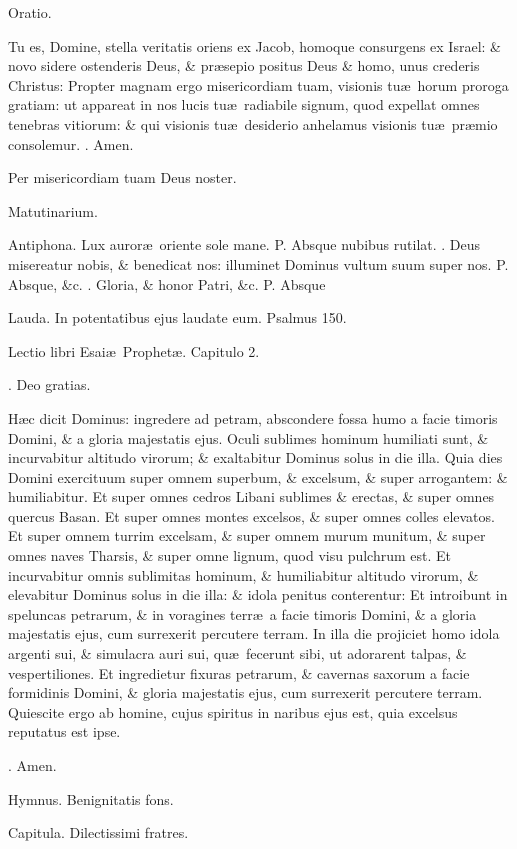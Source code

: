 \documentclass[letter,11pt]{book}
\makeatletter
\DeclareRobustCommand{\Vbar}{\vers@resp{-0.1em}{V}}
\DeclareRobustCommand{\Rbar}{\vers@resp{0pt}{R}}
\newcommand{\vers@resp@sym}{\raisebox{0.2ex}{\rotatebox[origin=c]{-20}{$\m@th\rceil$}}}
\newcommand{\vers@resp}[2]{%
  {\ooalign{\hidewidth\kern#1\vers@resp@sym\hidewidth\cr#2\cr}}%
}%
\def\P{\color{Red} P. \color{black}}
\def\V{\color{Red} \Vbar . \color{black}}
\def\R{\color{Red} \Rbar . \color{black}}
\makeatother
\begin{document}
\begin{multicols*}{2}
Oratio.

Tu es, Domine, stella veritatis oriens ex Jacob, homoque consurgens ex Israel: \& novo sidere ostenderis Deus, \& pr\ae sepio positus Deus \& homo, unus crederis Christus: Propter magnam ergo misericordiam tuam, visionis tu\ae \ horum proroga gratiam: ut appareat in nos lucis tu\ae \ radiabile signum, quod expellat omnes tenebras vitiorum: \& qui visionis tu\ae \ desiderio anhelamus visionis tu\ae \ pr\ae mio consolemur.
\R Amen.

Per misericordiam tuam Deus noster.

Matutinarium.

Antiphona. Lux auror\ae \ oriente sole mane. \P Absque nubibus rutilat. \V Deus misereatur nobis, \& benedicat nos: illuminet Dominus vultum suum super nos. \P Absque, \&c. \V Gloria, \& honor Patri, \&c. \P Absque

Lauda. In potentatibus ejus laudate eum. Psalmus 150.

Lectio libri Esai\ae \ Prophet\ae . Capitulo 2.

\R Deo gratias.

H\ae c dicit Dominus: ingredere ad petram, abscondere fossa humo a facie timoris Domini, \& a gloria majestatis ejus. Oculi sublimes hominum humiliati sunt, \& incurvabitur altitudo virorum; \& exaltabitur Dominus solus in die illa. Quia dies Domini exercituum super omnem superbum, \& excelsum, \& super arrogantem: \& humiliabitur. Et super omnes cedros Libani sublimes \& erectas, \& super omnes quercus Basan. Et super omnes montes excelsos, \& super omnes colles elevatos. Et super omnem turrim excelsam, \& super omnem murum munitum, \& super omnes naves Tharsis, \& super omne lignum, quod visu pulchrum est. Et incurvabitur omnis sublimitas hominum, \& humiliabitur altitudo virorum, \& elevabitur Dominus solus in die illa: \& idola penitus conterentur: Et introibunt in speluncas petrarum, \& in voragines terr\ae \ a facie timoris Domini, \& a gloria majestatis ejus, cum surrexerit percutere terram. In illa die projiciet homo idola argenti sui, \& simulacra auri sui, qu\ae \ fecerunt sibi, ut adorarent talpas, \& vespertiliones. Et ingredietur fixuras petrarum, \& cavernas saxorum a facie formidinis Domini, \& gloria majestatis ejus, cum surrexerit percutere terram. Quiescite ergo ab homine, cujus spiritus in naribus ejus est, quia excelsus reputatus est ipse.

\R Amen.

Hymnus. Benignitatis fons.

Capitula. Dilectissimi fratres.


\end{multicols*}
\end{document}
